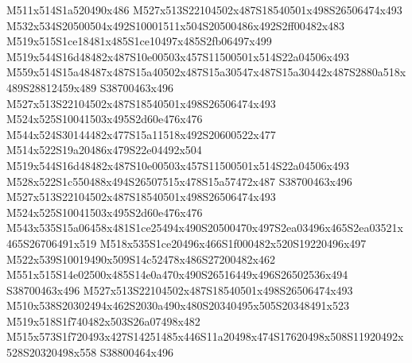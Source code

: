\documentclass{article}
\begin{document}
\begin{multicols}{2}
M511x514S1a520490x486 M527x513S22104502x487S18540501x498S26506474x493 M532x534S20500504x492S10001511x504S20500486x492S2ff00482x483 M519x515S1ce18481x485S1ce10497x485S2fb06497x499 M519x544S16d48482x487S10e00503x457S11500501x514S22a04506x493 M559x514S15a48487x487S15a40502x487S15a30547x487S15a30442x487S2880a518x489S28812459x489 S38700463x496 M527x513S22104502x487S18540501x498S26506474x493 M524x525S10041503x495S2d60e476x476 M544x524S30144482x477S15a11518x492S20600522x477 M514x522S19a20486x479S22e04492x504 M519x544S16d48482x487S10e00503x457S11500501x514S22a04506x493 M528x522S1c550488x494S26507515x478S15a57472x487 S38700463x496 M527x513S22104502x487S18540501x498S26506474x493 M524x525S10041503x495S2d60e476x476 M543x535S15a06458x481S1ce25494x490S20500470x497S2ea03496x465S2ea03521x465S26706491x519 M518x535S1ce20496x466S1f000482x520S19220496x497 M522x539S10019490x509S14c52478x486S27200482x462 M551x515S14e02500x485S14e0a470x490S26516449x496S26502536x494 S38700463x496 M527x513S22104502x487S18540501x498S26506474x493 M510x538S20302494x462S2030a490x480S20340495x505S20348491x523 M519x518S1f740482x503S26a07498x482 M515x573S1f720493x427S14251485x446S11a20498x474S17620498x508S11920492x528S20320498x558 S38800464x496


\end{multicols}
\end{document}

